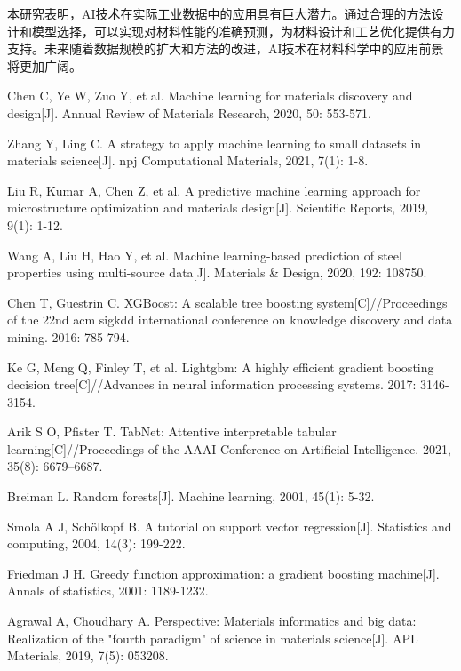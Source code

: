 \documentclass[12pt,a4paper]{article}
\begin{document}
本研究表明，AI技术在实际工业数据中的应用具有巨大潜力。通过合理的方法设计和模型选择，可以实现对材料性能的准确预测，为材料设计和工艺优化提供有力支持。未来随着数据规模的扩大和方法的改进，AI技术在材料科学中的应用前景将更加广阔。



\begin{thebibliography}{99}

Chen C, Ye W, Zuo Y, et al. Machine learning for materials discovery and design[J]. Annual Review of Materials Research, 2020, 50: 553-571.

Zhang Y, Ling C. A strategy to apply machine learning to small datasets in materials science[J]. npj Computational Materials, 2021, 7(1): 1-8.

Liu R, Kumar A, Chen Z, et al. A predictive machine learning approach for microstructure optimization and materials design[J]. Scientific Reports, 2019, 9(1): 1-12.

Wang A, Liu H, Hao Y, et al. Machine learning-based prediction of steel properties using multi-source data[J]. Materials \& Design, 2020, 192: 108750.

Chen T, Guestrin C. XGBoost: A scalable tree boosting system[C]//Proceedings of the 22nd acm sigkdd international conference on knowledge discovery and data mining. 2016: 785-794.

Ke G, Meng Q, Finley T, et al. Lightgbm: A highly efficient gradient boosting decision tree[C]//Advances in neural information processing systems. 2017: 3146-3154.

Arik S O, Pfister T. TabNet: Attentive interpretable tabular learning[C]//Proceedings of the AAAI Conference on Artificial Intelligence. 2021, 35(8): 6679--6687.

Breiman L. Random forests[J]. Machine learning, 2001, 45(1): 5-32.

Smola A J, Schölkopf B. A tutorial on support vector regression[J]. Statistics and computing, 2004, 14(3): 199-222.

Friedman J H. Greedy function approximation: a gradient boosting machine[J]. Annals of statistics, 2001: 1189-1232.

Agrawal A, Choudhary A. Perspective: Materials informatics and big data: Realization of the "fourth paradigm" of science in materials science[J]. APL Materials, 2019, 7(5): 053208.


\end{thebibliography}
\end{document}
